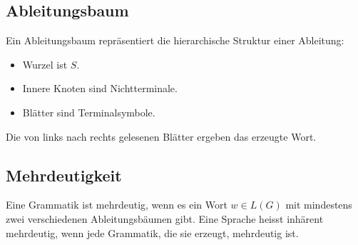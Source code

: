 \subsection{Ableitungsbaum}
Ein Ableitungsbaum repräsentiert die hierarchische Struktur einer Ableitung:
\begin{itemize}
	\item Wurzel ist $S$.
	\item Innere Knoten sind Nichtterminale.
	\item Blätter sind Terminalsymbole.
\end{itemize}
Die von links nach rechts gelesenen Blätter ergeben das erzeugte Wort.

\subsection{Mehrdeutigkeit}
Eine Grammatik ist mehrdeutig, wenn es ein Wort $w \in L(G)$ mit mindestens zwei verschiedenen Ableitungsbäumen gibt.
Eine Sprache heisst inhärent mehrdeutig, wenn jede Grammatik, die sie erzeugt, mehrdeutig ist.
